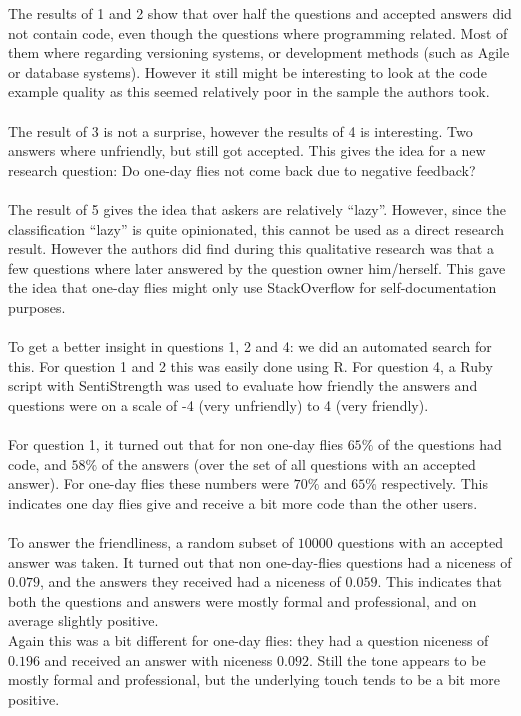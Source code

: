 \documentclass[conference]{IEEEtran}
\begin{document}
The results of 1 and 2 show that over half the questions and accepted answers did not contain code, even though the questions where programming related. Most of them where regarding versioning systems, or development methods (such as Agile or database systems).  However it still might be interesting to look at the code example quality as this seemed relatively poor in the sample the authors took.
\\
\\
The result of 3 is not a surprise, however the results of 4 is interesting. Two answers where unfriendly, but still got accepted. This gives the idea for a new research question: Do one-day flies  not come back due to negative feedback? 
\\
\\
The result of 5  gives the idea that askers are relatively ``lazy''. However, since the classification ``lazy'' is quite opinionated, this cannot be used as a direct research result. However the authors did find during this qualitative research was that a few questions where later answered by the question owner him/herself. This gave the idea that one-day flies might only use StackOverflow for self-documentation purposes. 
\\
\\
To get a better insight in questions 1, 2 and 4: we did an automated search for this. For question 1 and 2 this was easily done using R. For question 4, a Ruby script with SentiStrength \cite{sentistrength} was used to evaluate how friendly the answers and questions were on a scale of -4 (very unfriendly) to 4 (very friendly). 
\\
\\
For question 1, it turned out that for non one-day flies $65\%$ of the questions had code, and $58\%$ of the answers (over the set of all questions with an accepted answer). For one-day flies these numbers were $70\%$ and $65\%$ respectively. This indicates one day flies give and receive a bit more code than the other users.
\\
\\
To answer the friendliness, a random subset of $10000$ questions with an accepted answer was taken. It turned out that non one-day-flies questions had a niceness of $0.079$, and the answers they received had a niceness of $0.059$. This indicates that both the questions and answers were mostly formal and professional, and on average slightly positive.
\\
Again this was a bit different for one-day flies: they had a question niceness of $0.196$ and received an answer with niceness $0.092$. Still the tone appears to be mostly formal and professional, but the underlying touch tends to be a bit more positive.
\end{document}
